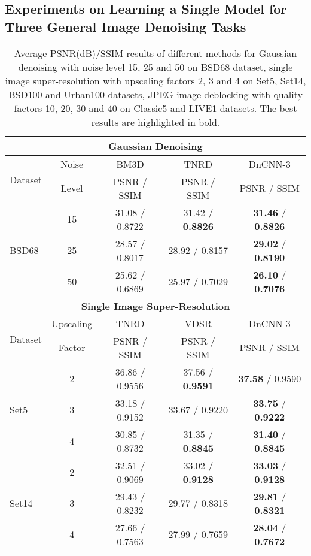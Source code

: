 \documentclass[journal]{IEEEtran}
\begin{document}
\subsection{{Experiments on Learning a Single Model for Three General Image Denoising Tasks}}\label{sec: expGID}


\begin{table}[!htbp]\scriptsize
\caption{Average PSNR(dB)/SSIM results of different methods for Gaussian denoising with noise level 15, 25 and 50 on BSD68 dataset, single image super-resolution with upscaling factors 2, 3 and 4 on Set5, Set14, BSD100 and Urban100 datasets, JPEG image deblocking with quality factors 10, 20, 30 and 40 on  Classic5 and LIVE1 datasets. The best results are highlighted in bold.} \center
\begin{tabular}{|l|c|c|c|c|}

 \hline \multicolumn{5}{|c|}{\textbf{Gaussian Denoising}}    \\ \hline
  \multirow{2}{*}{Dataset} & Noise & BM3D & TNRD & DnCNN-3  \\
  \cline{3-5}
  & Level & PSNR / SSIM & PSNR / SSIM & PSNR / SSIM  \\ \hline
     &15 & 31.08 / 0.8722 & 31.42 / \textbf{0.8826}&\textbf{31.46} / \textbf{0.8826}  \\
 BSD68 &25 & 28.57 / 0.8017 & 28.92 / 0.8157 &\textbf{29.02} / \textbf{0.8190}  \\
  &50 & 25.62 / 0.6869 &  25.97 / 0.7029 &\textbf{26.10} / \textbf{0.7076}  \\ \hline \hline


   \multicolumn{5}{|c|}{\textbf{Single Image Super-Resolution}}    \\ \hline

 \multirow{2}{*}{Dataset} & Upscaling & TNRD & VDSR & DnCNN-3   \\
 \cline{3-5}
  & Factor & PSNR / SSIM & PSNR / SSIM & PSNR / SSIM  \\ \hline
  &2 & 36.86 / 0.9556 &  37.56 / \textbf{0.9591} &\textbf{37.58} / 0.9590   \\
 Set5 & 3 & 33.18 / 0.9152 &  33.67 / 0.9220 &\textbf{33.75} / \textbf{0.9222}  \\
  & 4 & 30.85 / 0.8732 &  31.35 / \textbf{0.8845} &\textbf{31.40} / \textbf{0.8845}  \\\hline

    & 2 & 32.51 / 0.9069 & 33.02 / \textbf{0.9128} &\textbf{33.03} / \textbf{0.9128}  \\
 Set14 &3 & 29.43 / 0.8232 & 29.77 / 0.8318 &\textbf{29.81} / \textbf{0.8321}  \\
  & 4 & 27.66 / 0.7563 &  27.99 / 0.7659 &\textbf{28.04} / \textbf{0.7672}  \\\hline


\end{tabular}
\end{table}
\end{document}
